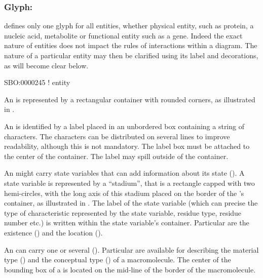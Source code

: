 
\subsubsection{Glyph: }
\label{sec:entity}

\SBGNERLone defines only one glyph for all entities, whether physical entity, such as protein, a nucleic acid, metabolite or functional entity such as a gene. Indeed the exact nature of entities does not impact the rules of interactions within a diagram. The nature of a particular entity may then be clarified using its label and decorations, as will become clear below. 

\begin{glyphDescription}

\glyphSboTerm SBO:0000245 ! entity 

\glyphContainer An  is represented by a rectangular container with rounded corners, as illustrated in .

\glyphLabel An  is identified by a label placed in an unbordered box containing a string of characters.  The characters can be distributed on several lines to improve readability, although this is not mandatory.  The label box must be attached to the center of the container. The label may spill outside of the container. 

\glyphAux An  might carry state variables that can add information about its state ().  A state variable is represented by a ``stadium'', that is a rectangle capped with two hemi-circles, with the long axis of this stadium placed on the border of the 's container, as illustrated in .  The label of the state variable (which can precise the type of characteristic represented by the state variable, residue type, residue number etc.) is written within the state variable's container. Particular  are the existence () and the location ().

An  can carry one or several  ().  Particular  are available for describing the material type () and the conceptual type () of a macromolecule.  The center of the bounding box of a  is located on the mid-line of the border of the macromolecule.
% 

\end{glyphDescription}

